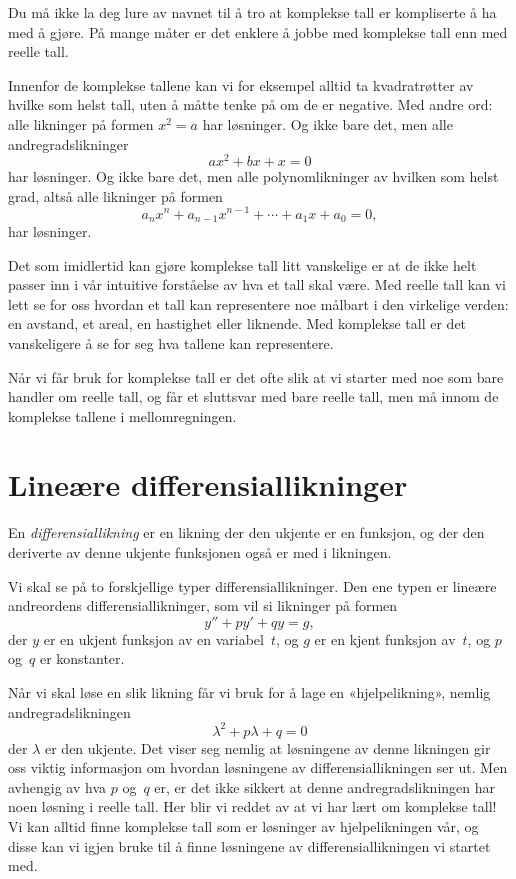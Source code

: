 Du må ikke la deg lure av navnet til å tro at komplekse tall er
kompliserte å ha med å gjøre.  På mange måter er det enklere å jobbe
med komplekse tall enn med reelle tall.

Innenfor de komplekse tallene kan vi for eksempel alltid ta
kvadratrøtter av hvilke som helst tall, uten å måtte tenke på om de er
negative.  Med andre ord: alle likninger på formen $x^2 = a$ har
løsninger.  Og ikke bare det, men alle andregradslikninger
\[
a x^2 + bx + x = 0
\]
har løsninger.  Og ikke bare det, men alle polynomlikninger av hvilken
som helst grad, altså alle likninger på formen
\[
a_n x^n + a_{n-1} x^{n-1} + \cdots + a_1 x + a_0 = 0,
\]
har løsninger.

Det som imidlertid kan gjøre komplekse tall litt vanskelige er at de
ikke helt passer inn i vår intuitive forståelse av hva et tall skal
være.  Med reelle tall kan vi lett se for oss hvordan et tall kan
representere noe målbart i den virkelige verden: en avstand, et areal,
en hastighet eller liknende.  Med komplekse tall er det vanskeligere å
se for seg hva tallene kan representere.

Når vi får bruk for komplekse tall er det ofte slik at vi starter med
noe som bare handler om reelle tall, og får et sluttsvar med bare
reelle tall, men må innom de komplekse tallene i mellomregningen.


\section*{Lineære differensiallikninger}

En \emph{differensiallikning} er en likning der den ukjente er en
funksjon, og der den deriverte av denne ukjente funksjonen også er med
i likningen.

Vi skal se på to forskjellige typer differensiallikninger.  Den ene
typen er lineære andreordens differensiallikninger, som vil si
likninger på formen
\[
y'' + p y' + q y = g,
\]
der $y$ er en ukjent funksjon av en variabel~$t$, og $g$ er en kjent
funksjon av~$t$, og $p$ og~$q$ er konstanter.

Når vi skal løse en slik likning får vi bruk for å lage en
«hjelpelikning», nemlig andregradslikningen
\[
\lambda^2 + p \lambda + q = 0
\]
der $\lambda$ er den ukjente.  Det viser seg nemlig at løsningene av
denne likningen gir oss viktig informasjon om hvordan løsningene av
differensiallikningen ser ut.  Men avhengig av hva $p$ og~$q$ er, er
det ikke sikkert at denne andregradslikningen har noen løsning i
reelle tall.  Her blir vi reddet av at vi har lært om komplekse tall!
Vi kan alltid finne komplekse tall som er løsninger av hjelpelikningen
vår, og disse kan vi igjen bruke til å finne løsningene av
differensiallikningen vi startet med.

